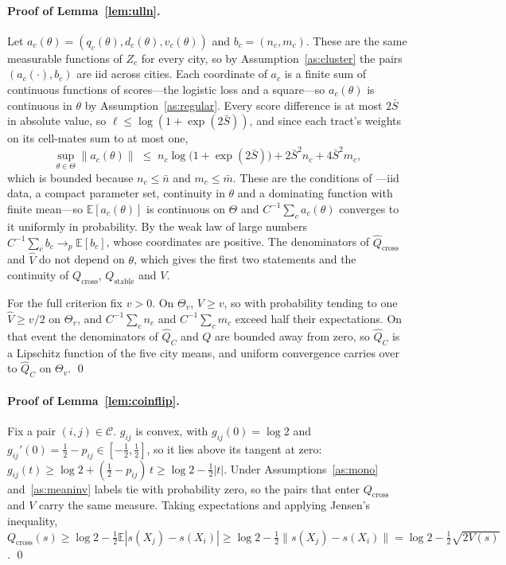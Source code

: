 \documentclass[11pt]{article}
\theoremstyle{remark}
\newcommand{\E}{\mathbb{E}}
\newcommand{\Qc}{Q_{\mathrm{cross}}}
\newcommand{\Qs}{Q_{\mathrm{stable}}}
\newcommand{\Qt}{Q}
\newcommand{\Qch}{\hat{Q}_{\mathrm{cross}}}
\newcommand{\Qth}{\hat{Q}}
\newcommand{\Cc}{\mathcal{C}}
\begin{document}
\paragraph{Proof of Lemma~\ref{lem:ulln}.} Let $a_c(\theta) = (q_c(\theta), d_c(\theta), v_c(\theta))$
and $b_c = (n_c, m_c)$. These are the same measurable functions of $Z_c$ for every city, so by
Assumption~\ref{as:cluster} the pairs $(a_c(\cdot), b_c)$ are iid across cities. Each coordinate of
$a_c$ is a finite sum of continuous functions of scores---the logistic loss and a square---so
$a_c(\theta)$ is continuous in $\theta$ by Assumption~\ref{as:regular}. Every score difference is at
most $2\bar{S}$ in absolute value, so $\ell \le \log(1+\exp(2\bar{S}))$, and since each tract's weights
on its cell-mates sum to at most one,
\[
    \sup_{\theta\in\Theta}\|a_c(\theta)\|
    \;\le\; n_c\log\big(1+\exp(2\bar{S})\big) + 2\bar{S}^{2}n_c + 4\bar{S}^{2}m_c,
\]
which is bounded because $n_c \le \bar{n}$ and $m_c \le \bar{m}$. These are the conditions of
\citet[Lemma 2.4]{newey1994}---iid data, a compact parameter set, continuity in $\theta$ and a
dominating function with finite mean---so $\E[a_c(\theta)]$ is continuous on $\Theta$ and
$C^{-1}\sum_c a_c(\theta)$ converges to it uniformly in probability. By the weak law of large numbers
$C^{-1}\sum_c b_c \to_p \E[b_c]$, whose coordinates are positive. The denominators of $\Qch$ and
$\hat V$ do not depend on $\theta$, which gives the first two statements and the continuity of $\Qc$,
$\Qs$ and $V$.

For the full criterion fix $v>0$. On $\Theta_v$, $V \ge v$, so with probability tending to one
$\hat{V} \ge v/2$ on $\Theta_v$, and $C^{-1}\sum_c n_c$ and $C^{-1}\sum_c m_c$ exceed half their
expectations. On that event the denominators of $\Qth_C$ and $\Qt$ are bounded away from zero, so
$\Qth_C$ is a Lipschitz function of the five city means, and uniform convergence carries over to
$\Qth_C$ on $\Theta_v$. \qed

\paragraph{Proof of Lemma~\ref{lem:coinflip}.} Fix a pair $(i,j)\in\Cc$. $g_{ij}$ is convex, with
$g_{ij}(0) = \log 2$ and $g_{ij}'(0) = \tfrac12 - p_{ij} \in [-\tfrac12,\tfrac12]$, so it lies above its
tangent at zero: $g_{ij}(t) \ge \log 2 + (\tfrac12-p_{ij})\,t \ge \log 2 - \tfrac12|t|$. Under
Assumptions~\ref{as:mono} and~\ref{as:meaninv} labels tie with probability zero, so the pairs that
enter $\Qc$ and $V$ carry the same measure. Taking expectations and applying Jensen's inequality,
$\Qc(s) \ge \log 2 - \tfrac12\E|s(X_j)-s(X_i)| \ge \log 2 - \tfrac12\|s(X_j)-s(X_i)\|
= \log 2 - \tfrac12\sqrt{2V(s)}$. \qed
\end{document}
